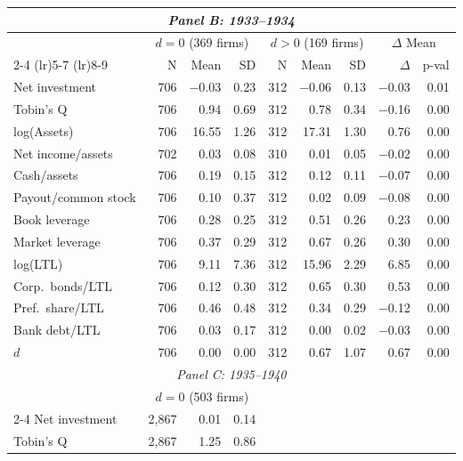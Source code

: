 \begin{table}[p]
\begin{threeparttable}
\begin{tabular}{l rrr rrr rr}
            \multicolumn{9}{c}{\textit{Panel B: 1933--1934}} \\
            \midrule
             & \multicolumn{3}{c}{$d = 0$ (369 firms)} & \multicolumn{3}{c}{$d > 0$ (169 firms)} & \multicolumn{2}{c}{$\Delta$ Mean} \\
            \cmidrule(lr){2-4} \cmidrule(lr){5-7} \cmidrule(lr){8-9}
             & N & Mean & SD & N & Mean & SD & $\Delta$ & p-val \\
            Net investment & 706 & $-$0.03 & 0.23 & 312 & $-$0.06 & 0.13 & $-$0.03 & 0.01 \\
            Tobin's Q & 706 & 0.94 & 0.69 & 312 & 0.78 & 0.34 & $-$0.16 & 0.00 \\
            log(Assets) & 706 & 16.55 & 1.26 & 312 & 17.31 & 1.30 & 0.76 & 0.00 \\
            Net income/assets & 702 & 0.03 & 0.08 & 310 & 0.01 & 0.05 & $-$0.02 & 0.00 \\
            Cash/assets & 706 & 0.19 & 0.15 & 312 & 0.12 & 0.11 & $-$0.07 & 0.00 \\
            Payout/common stock & 706 & 0.10 & 0.37 & 312 & 0.02 & 0.09 & $-$0.08 & 0.00 \\
            Book leverage & 706 & 0.28 & 0.25 & 312 & 0.51 & 0.26 & 0.23 & 0.00 \\
            Market leverage & 706 & 0.37 & 0.29 & 312 & 0.67 & 0.26 & 0.30 & 0.00 \\
            log(LTL) & 706 & 9.11 & 7.36 & 312 & 15.96 & 2.29 & 6.85 & 0.00 \\
            Corp.\ bonds/LTL & 706 & 0.12 & 0.30 & 312 & 0.65 & 0.30 & 0.53 & 0.00 \\
            Pref.\ share/LTL & 706 & 0.46 & 0.48 & 312 & 0.34 & 0.29 & $-$0.12 & 0.00 \\
            Bank debt/LTL & 706 & 0.03 & 0.17 & 312 & 0.00 & 0.02 & $-$0.03 & 0.00 \\
            \ensuremath{d} & 706 & 0.00 & 0.00 & 312 & 0.67 & 1.07 & 0.67 & 0.00 \\
            \midrule
            \multicolumn{9}{c}{\textit{Panel C: 1935--1940}} \\
            \midrule
             & \multicolumn{3}{c}{$d = 0$ (503 firms)} & \multicolumn{3}{c}{} & \multicolumn{2}{c}{} \\
            \cmidrule(lr){2-4}
            Net investment & 2,867 & 0.01 & 0.14 &  &  &  &  &  \\
            Tobin's Q & 2,867 & 1.25 & 0.86 &  &  &  &  &  \\

\end{tabular}
\end{threeparttable}
\end{table}
